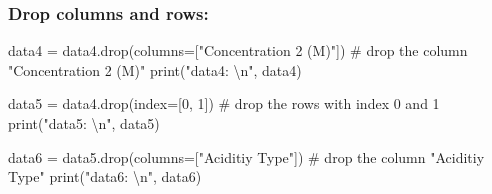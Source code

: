 \documentclass[
  letterpaper,
  DIV=11,
  numbers=noendperiod]{scrreprt}
\newenvironment{Shaded}{\begin{snugshade}}{\end{snugshade}}
\newcommand{\BuiltInTok}[1]{\textcolor[rgb]{0.00,0.23,0.31}{#1}}
\newcommand{\CharTok}[1]{\textcolor[rgb]{0.13,0.47,0.30}{#1}}
\newcommand{\CommentTok}[1]{\textcolor[rgb]{0.37,0.37,0.37}{#1}}
\newcommand{\DecValTok}[1]{\textcolor[rgb]{0.68,0.00,0.00}{#1}}
\newcommand{\NormalTok}[1]{\textcolor[rgb]{0.00,0.23,0.31}{#1}}
\newcommand{\OperatorTok}[1]{\textcolor[rgb]{0.37,0.37,0.37}{#1}}
\newcommand{\StringTok}[1]{\textcolor[rgb]{0.13,0.47,0.30}{#1}}
\begin{document}
\subsubsection*{Drop columns and rows:}\label{drop-columns-and-rows}

\begin{Shaded}
\begin{Highlighting}[]
\NormalTok{data4 }\OperatorTok{=}\NormalTok{ data4.drop(columns}\OperatorTok{=}\NormalTok{[}\StringTok{"Concentration 2 (M)"}\NormalTok{]) }\CommentTok{\# drop the column "Concentration 2 (M)"}
\BuiltInTok{print}\NormalTok{(}\StringTok{"data4: }\CharTok{\textbackslash{}n}\StringTok{"}\NormalTok{, data4)}

\NormalTok{data5 }\OperatorTok{=}\NormalTok{ data4.drop(index}\OperatorTok{=}\NormalTok{[}\DecValTok{0}\NormalTok{, }\DecValTok{1}\NormalTok{]) }\CommentTok{\# drop the rows with index 0 and 1}
\BuiltInTok{print}\NormalTok{(}\StringTok{"data5: }\CharTok{\textbackslash{}n}\StringTok{"}\NormalTok{, data5)}

\NormalTok{data6 }\OperatorTok{=}\NormalTok{ data5.drop(columns}\OperatorTok{=}\NormalTok{[}\StringTok{"Aciditiy Type"}\NormalTok{]) }\CommentTok{\# drop the column "Aciditiy Type"}
\BuiltInTok{print}\NormalTok{(}\StringTok{"data6: }\CharTok{\textbackslash{}n}\StringTok{"}\NormalTok{, data6)}
\end{Highlighting}
\end{Shaded}
\end{document}
